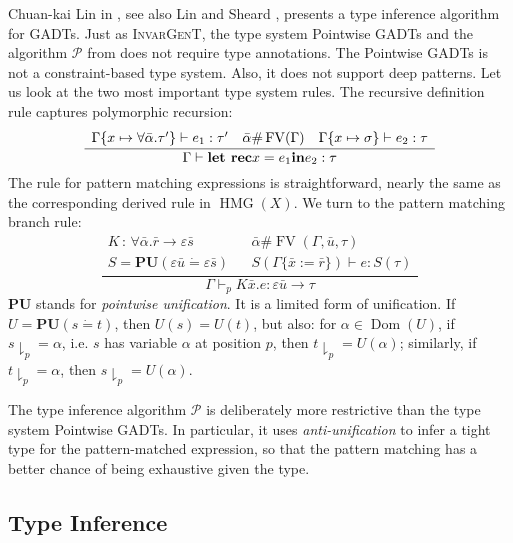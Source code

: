 \documentclass{article}
\newcommand{\assign}{:=}
\newcommand{\colons}{\,:\,}
\newcommand{\tmem}[1]{{\em #1\/}}
\newcommand{\tmmathbf}[1]{\ensuremath{\boldsymbol{#1}}}
\newcommand{\tmname}[1]{\textsc{#1}}
\newcommand{\tmop}[1]{\ensuremath{\operatorname{#1}}}
\newcommand{\tmstrong}[1]{\textbf{#1}}
\begin{document}
Chuan-kai Lin in {\cite{PracticalGADTsInfer}}, see also Lin  and  Sheard
{\cite{PointwiseGADTs}}, presents a type inference algorithm for GADTs. Just
as {\tmname{InvarGenT}}, the type system Pointwise GADTs and the algorithm
$\mathcal{P}$ from {\cite{PracticalGADTsInfer}} does not require type
annotations. The Pointwise GADTs is not a constraint-based type system. Also,
it does not support deep patterns. Let us look at the two most important type
system rules. The recursive definition rule captures polymorphic recursion:
\[ \frac{\begin{array}{lll}
     \Gamma \{x \mapsto \forall \bar{\alpha} . \tau^{\prime} \} \vdash e_1 :
     \tau^{\prime} & \bar{\alpha} \# \tmop{FV} (\Gamma) & \Gamma \{x \mapsto
     \sigma\} \vdash e_2 : \tau
   \end{array}}{\Gamma \vdash \text{{\tmstrong{let rec}}} x = e_1 
   \text{{\tmstrong{in}}} e_2 : \tau} \]
The rule for pattern matching expressions is straightforward, nearly the same
as the corresponding derived rule in $\tmop{HMG} (X)$. We turn to the pattern
matching branch rule:
\[ \frac{\begin{array}{lll}
     K \colons \forall \bar{\alpha} . \bar{r} \longrightarrow \varepsilon
     \bar{s} &  & \bar{\alpha} \# \tmop{FV} (\Gamma, \bar{u}, \tau)\\
     S =\tmmathbf{P}\tmmathbf{U} (\varepsilon \bar{u} \dot{=} \varepsilon
     \bar{s}) &  & S (\Gamma \{ \bar{x} \assign \bar{r} \}) \vdash e : S
     (\tau)
   \end{array}}{\Gamma \vdash_p K \bar{x} .e : \varepsilon \bar{u} \rightarrow
   \tau} \]
$\tmmathbf{P}\tmmathbf{U}$ stands for {\tmem{pointwise unification}}. It is a
limited form of unification. If $U =\tmmathbf{P}\tmmathbf{U} (s \dot{=} t)$,
then $U (s) = U (t)$, but also: for $\alpha \in \tmop{Dom} (U)$, if $s
\downharpoonright_p = \alpha$, i.e. $s$ has variable $\alpha$ at position $p$,
then $t \downharpoonright_p = U (\alpha)$; similarly, if $t
\downharpoonright_p = \alpha$, then $s \downharpoonright_p = U (\alpha)$.

The type inference algorithm $\mathcal{P}$ is deliberately more restrictive
than the type system Pointwise GADTs. In particular, it uses
{\tmem{anti-unification}} to infer a tight type for the pattern-matched
expression, so that the pattern matching has a better chance of being
exhaustive given the type.

\subsection{Type Inference}
\end{document}
